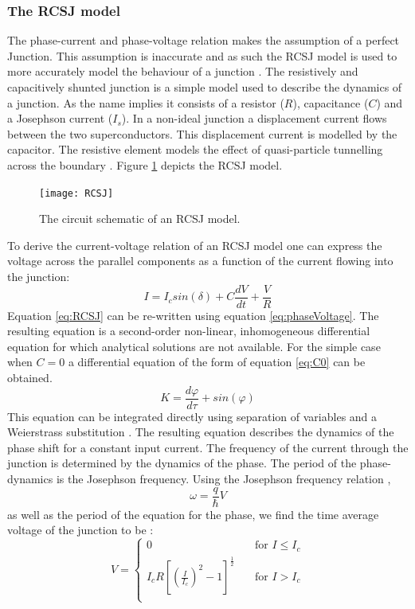 \subsubsection*{The RCSJ model}
The phase-current and phase-voltage relation makes the assumption of a perfect Junction. This assumption is inaccurate and as such the RCSJ model is used to more accurately model the behaviour of a junction \cite{Tinkham_2015}. The resistively and capacitively shunted junction is a simple model used to describe the dynamics of a junction. As the name implies it consists of a resistor ($R$), capacitance ($C$) and a Josephson current ($I_s$). In a non-ideal junction a displacement current flows between the two superconductors. This displacement current is modelled by the capacitor. The resistive element models the effect of quasi-particle tunnelling across the boundary \cite{Duzer_1999_Princip_Super}. Figure \ref{fig:RCSJ} depicts the RCSJ model. 
\begin{figure}[H]
    \centering
    \texttt{[image: RCSJ]}
    \caption{The circuit schematic of an RCSJ model.}
    \label{fig:RCSJ}
\end{figure}
To derive the current-voltage relation of an RCSJ model one can express the voltage across the parallel components as a function of the current flowing into the junction: 
\begin{equation}
    I = I_csin(\delta)+C\frac{dV}{dt}+\frac{V}{R}
    \label{eq:RCSJ}
\end{equation}
Equation \ref{eq:RCSJ} can be re-written using equation \ref{eq:phaseVoltage}. The resulting equation is a second-order non-linear, inhomogeneous differential equation for which analytical solutions are not available. For the simple case when $C=0$ a differential equation of the form of equation \ref{eq:C0} can be obtained.
\begin{equation}
    K = \frac{d\varphi }{d\tau} + sin(\varphi)
    \label{eq:C0}
\end{equation}
This equation can be integrated directly using separation of variables and a Weierstrass substitution \cite{Duzer_1999_Princip_Super}. The resulting equation describes the dynamics of the phase shift for a constant input current. The frequency of the current through the junction is determined by the dynamics of the phase. The period of the phase-dynamics is the Josephson frequency. Using the Josephson frequency relation \cite{Duzer_1999_Princip_Super},
\begin{equation}
    \omega = \frac{q}{\hbar}V
    \label{eq:JosephsonFreq}
\end{equation}
as well as the period of the equation for the phase, we find the time average voltage of the junction to be \cite{Duzer_1999_Princip_Super}:
\begin{equation}
    V = 
    \begin{cases}
        0 & \quad\text{for } I \le I_c\\
        I_cR[(\frac{I}{I_c})^2-1]^\frac{1}{2} & \quad\text{for } I > I_c\\
    \end{cases}
    \label{eq:IVCHAR}
\end{equation}

